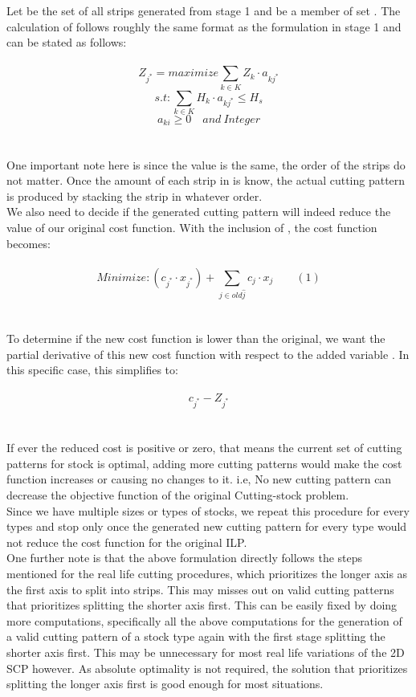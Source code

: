\documentclass[a4paper]{article}
\begin{document}
    Let  be the set of all strips generated from stage 1 and  be a member of set . The calculation of  follows roughly the same format as the formulation in stage 1 and can be stated as follows:
    \\ \\
    \[ Z_{j^*} = maximize \sum_{k \in K} Z_k \cdot a_{kj^*} \]
    \[ s.t: \sum_{k \in K} H_k \cdot a_{kj^*} \leqslant H_s\]
    \[ a_{ki} \geqslant 0 \quad and \  Integer \]
    \\ \\
    One important note here is since the value is the same, the order of the strips do not matter. Once the amount of each strip in  is know, the actual cutting pattern is produced by stacking the strip in whatever order. 
    \vspace{0.2cm}\\
    We also need to decide if the generated cutting pattern  will indeed reduce the value of our original cost function. With the inclusion of , the cost function becomes:
    \\ \\
    \[ Minimize: (c_{j^*} \cdot x_{j^*}) + \sum_{j \in old\hat{j}} c_j \cdot x_j \qquad (1)\]
    \\ \\
    To determine if the new cost function is lower than the original, we want the partial derivative of this new cost function with respect to the added variable . In this specific case, this simplifies to:
    \\ \\
    \[ c_{j^*} - Z_{j^*} \]
    \\ \\
    If ever the reduced cost is positive or zero, that means the current set of cutting patterns for stock  is optimal, adding more cutting patterns would make the cost function increases or causing no changes to it.
    i.e, No new cutting pattern can decrease the objective function of the original Cutting-stock problem.
    \vspace{0.2cm}\\
    Since we have multiple sizes or types of stocks, we repeat this procedure for every types and stop only once the generated new cutting pattern  for every type would not reduce the cost function for the original ILP.
    \vspace{0.2cm}\\
    One further note is that the above formulation directly follows the steps mentioned for the real life cutting procedures, which prioritizes the longer axis as the first axis to split into strips. 
    This may misses out on valid cutting patterns that prioritizes splitting the shorter axis first.
    This can be easily fixed by doing more computations, specifically all the above computations for the generation of a valid cutting pattern of a stock type  again with the first stage splitting the shorter axis first.
    This may be unnecessary for most real life variations of the 2D SCP however. As absolute optimality is not required, the solution that prioritizes splitting the longer axis first is good enough for most situations.
\end{document}
